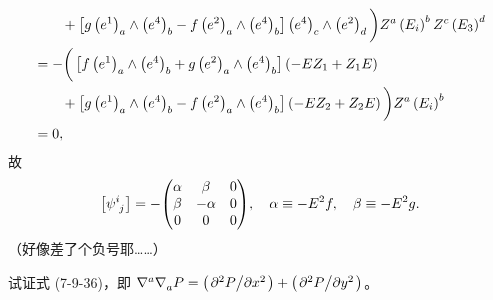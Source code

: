 \begin{xiti}
\begin{zm}
\begin{align*}
			&\qquad {}+ \left[ g \tensor{\left( e^1 \right)}{_a} \wedge \tensor{\left( e^4 \right)}{_b} - f \tensor{\left( e^2 \right)}{_a} \wedge \tensor{\left( e^4 \right)}{_b} \right] \tensor{\left( e^4 \right)}{_c} \wedge \tensor{\left( e^2 \right)}{_d} \bigg) \tensor{Z}{^a} \tensor{\left( E_i \right)}{^b} \tensor{Z}{^c} \tensor{\left( E_3 \right)}{^d}\\
			&= - \bigg( \left[ f \tensor{\left( e^1 \right)}{_a} \wedge \tensor{\left( e^4 \right)}{_b} + g \tensor{\left( e^2 \right)}{_a} \wedge \tensor{\left( e^4 \right)}{_b} \right] \left( - E Z_1 + Z_1 E \right)\\
			&\qquad {} + \left[ g \tensor{\left( e^1 \right)}{_a} \wedge \tensor{\left( e^4 \right)}{_b} - f \tensor{\left( e^2 \right)}{_a} \wedge \tensor{\left( e^4 \right)}{_b} \right] \left( - E Z_2 + Z_2 E \right) \bigg) \tensor{Z}{^a} \tensor{\left( E_i \right)}{^b}\\
			&= 0,
		\end{align*}
		故
		\begin{equation*}
			\left[ \tensor{\psi}{^i_j} \right] = - \mqty(
				\alpha & \beta & 0 \\
				\beta & -\alpha & 0\\
				0 & 0 & 0
			)
			\qc \alpha \equiv - E^2 f \qc \beta \equiv - E^2 g.
		\end{equation*}
		（好像差了个负号耶……）
	\end{zm}

	\item 试证式 (7-9-36)，即 $\tensor{\nabla}{^a} \tensor{\nabla}{_a} P = \left( \pdv*[2]{P}{x} \right) + \left( \pdv*[2]{P}{y} \right)$。


\end{xiti}
